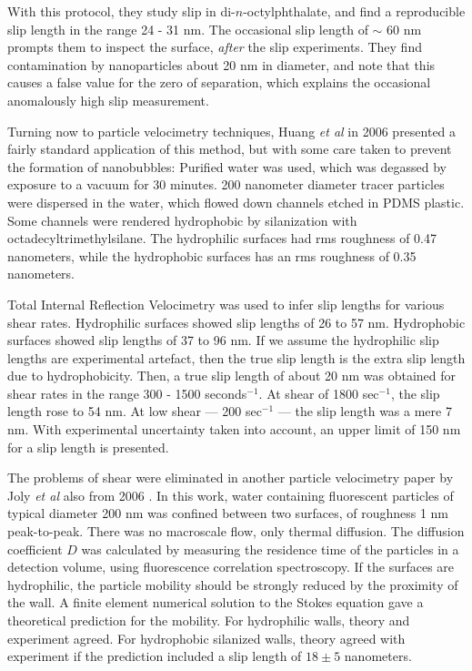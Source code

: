\documentclass[12pt, a4paper, twoside, openright]{book}
\begin{document}
With this protocol, they study slip in di-$n$-octylphthalate, and find a reproducible slip length in the range 24 - 31 nm.  The occasional slip length of  $\sim$ 60 nm prompts them to inspect the surface, \emph{after} the slip experiments.  They find contamination by nanoparticles about 20 nm in diameter, and note that this causes a false value for the zero of separation, which explains the occasional  anomalously high slip measurement.


\vspace{2em}
Turning now to particle velocimetry techniques, Huang \emph{et al} in 2006 \cite{Huang2006}  presented a fairly standard application of this method, but with some care taken to prevent the formation of nanobubbles: Purified water was used, which was degassed by exposure to a vacuum for 30 minutes.
200 nanometer diameter tracer particles were dispersed in the water, which flowed down channels etched in PDMS plastic.  Some channels were rendered hydrophobic by silanization with octadecyltrimethylsilane. The hydrophilic surfaces had rms roughness of 0.47 nanometers, while the hydrophobic surfaces has an rms roughness of 0.35 nanometers.

Total Internal Reflection Velocimetry was used to infer slip lengths for various shear rates. Hydrophilic surfaces showed slip lengths of 26 to 57 nm.  Hydrophobic surfaces showed slip lengths of 37 to 96 nm. If we assume the hydrophilic slip lengths are experimental artefact, then the true slip length is the extra slip length due to hydrophobicity.  Then, a true slip length of about 20 nm was obtained for shear rates in the range 300 - 1500 seconds$^{-1}$. At shear of 1800 sec$^{-1}$, the slip length rose to 54 nm. At low shear --- 200 sec$^{-1}$ --- the slip length was a mere 7 nm. With experimental uncertainty taken into account, an upper limit of 150 nm for a slip length is presented.

\vspace*{1em}
The problems of shear were eliminated in another particle velocimetry paper by Joly \emph{et al} also from 2006 \cite{Joly2006}.  In this work, water containing fluorescent particles of typical diameter 200 nm was confined between two surfaces, of roughness 1 nm peak-to-peak. There was no macroscale flow, only thermal diffusion.  The diffusion coefficient $D$ was calculated by measuring the residence time of the particles in a detection volume, using fluorescence correlation spectroscopy. If the surfaces are hydrophilic, the particle mobility should be strongly reduced by the proximity of the wall.  A finite element numerical solution to the Stokes equation gave a theoretical prediction for the mobility. For hydrophilic walls, theory and experiment agreed. For hydrophobic silanized walls, theory agreed with experiment if the prediction included a slip length of $18 \pm 5$ nanometers.
\end{document}
